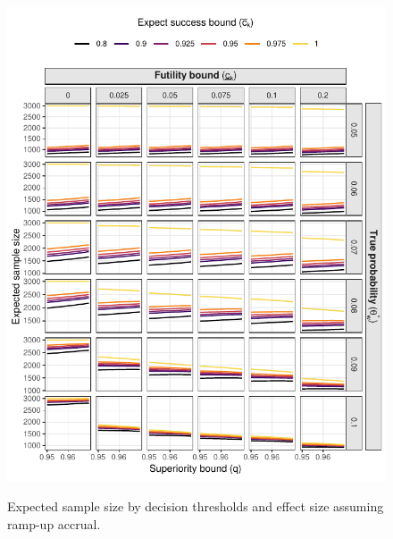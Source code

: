 \documentclass{article}
\begin{document}
\begin{figure}[!ht]
	\caption{Expected sample size by decision thresholds and effect size assuming ramp-up accrual.}
	\includegraphics{figures/expected_ss_5.pdf}
	\label{fig:expected_ss_rampup}
\end{figure}
\end{document}
